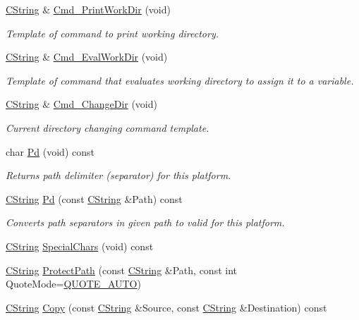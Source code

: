 \begin{DoxyCompactItemize}
\hyperlink{classCString}{C\-String} \& \hyperlink{classCPlatform_a16319c4d98b155cbcfd0764bda060eff}{Cmd\-\_\-\-Print\-Work\-Dir} (void)
\begin{DoxyCompactList}\small\item\em Template of command to print working directory. \end{DoxyCompactList}\item 
\hyperlink{classCString}{C\-String} \& \hyperlink{classCPlatform_ab841978e1990b99bfefa87b8b298b9a1}{Cmd\-\_\-\-Eval\-Work\-Dir} (void)
\begin{DoxyCompactList}\small\item\em Template of command that evaluates working directory to assign it to a variable. \end{DoxyCompactList}\item 
\hyperlink{classCString}{C\-String} \& \hyperlink{classCPlatform_a9fbeaca441315fd74d68f62f843ac9b0}{Cmd\-\_\-\-Change\-Dir} (void)
\begin{DoxyCompactList}\small\item\em Current directory changing command template. \end{DoxyCompactList}\item 
char \hyperlink{classCPlatform_a3c452f002bcb854cb4cefc95d78afd8e}{Pd} (void) const 
\begin{DoxyCompactList}\small\item\em Returns path delimiter (separator) for this platform. \end{DoxyCompactList}\item 
\hyperlink{classCString}{C\-String} \hyperlink{classCPlatform_ad426cac5b320bda610d218c5dfd41d3a}{Pd} (const \hyperlink{classCString}{C\-String} \&Path) const 
\begin{DoxyCompactList}\small\item\em Converts path separators in given path to valid for this platform. \end{DoxyCompactList}\item 
\hyperlink{classCString}{C\-String} \hyperlink{classCPlatform_ab8e092160f0f6621abbb9996d800cfa9}{Special\-Chars} (void) const 
\item 
\hyperlink{classCString}{C\-String} \hyperlink{classCPlatform_ae929073866753a81da1a256b70db4ce8}{Protect\-Path} (const \hyperlink{classCString}{C\-String} \&Path, const int Quote\-Mode=\hyperlink{cbhelper_8h_ab266b1b0a34471e2b2638bb70312662d}{Q\-U\-O\-T\-E\-\_\-\-A\-U\-T\-O})
\item 
\hyperlink{classCString}{C\-String} \hyperlink{classCPlatform_af505ad7b98c2dabffa5a5ae0e551ee38}{Copy} (const \hyperlink{classCString}{C\-String} \&Source, const \hyperlink{classCString}{C\-String} \&Destination) const 

\end{DoxyCompactItemize}
